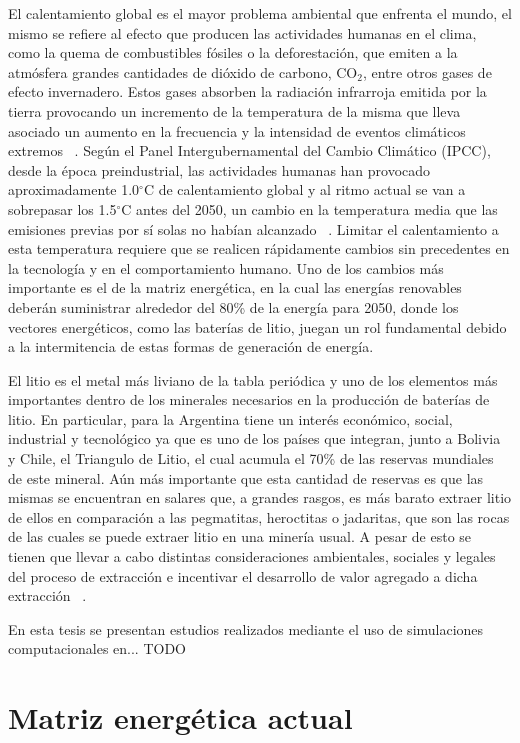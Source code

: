 El calentamiento global es el mayor problema ambiental que enfrenta el mundo, el 
mismo se refiere al efecto que producen las actividades humanas en el clima, como 
la quema de combustibles fósiles o la deforestación, que emiten a la atmósfera
grandes cantidades de dióxido de carbono, CO$_2$, entre otros gases de efecto 
invernadero. Estos gases absorben la radiación infrarroja emitida por la tierra 
provocando un incremento de la temperatura de la misma que lleva asociado un 
aumento en la frecuencia y la intensidad de eventos climáticos extremos 
~\cite{houghton2005}. Según el Panel Intergubernamental del Cambio Climático 
(IPCC), desde la época preindustrial, las actividades humanas han provocado 
aproximadamente 1.0$^{\circ}$C de calentamiento global y al ritmo actual se van 
a sobrepasar los 1.5$^{\circ}$C antes del 2050, un cambio en la temperatura
media que las emisiones previas por sí solas no habían alcanzado
~\cite{harvey2018}. Limitar el calentamiento a esta temperatura requiere que se 
realicen rápidamente cambios sin precedentes en la tecnología y en el 
comportamiento humano. Uno de los cambios más importante es el de la matriz 
energética, en la cual las energías renovables deberán suministrar alrededor del 
80\% de la energía para 2050, donde los vectores energéticos, como las baterías 
de litio, juegan un rol fundamental debido a la intermitencia de estas formas de 
generación de energía.

El litio es el metal más liviano de la tabla periódica y uno de los elementos más
importantes dentro de los minerales necesarios en la producción de baterías de
litio. En particular, para la Argentina tiene un interés económico, social, 
industrial y tecnológico ya que es uno de los países que integran, junto a 
Bolivia y Chile, el Triangulo de Litio, el cual acumula el 70\% de las reservas 
mundiales de este mineral. Aún más importante que esta cantidad de reservas es 
que las mismas se encuentran en salares que, a grandes rasgos, es más barato
extraer litio de ellos en comparación a las pegmatitas, heroctitas o jadaritas, 
que son las rocas de las cuales se puede extraer litio en una minería usual.
A pesar de esto se tienen que llevar a cabo distintas consideraciones ambientales, 
sociales y legales del proceso de extracción e incentivar el desarrollo de valor
agregado a dicha extracción ~\cite{heredia2020}.

En esta tesis se presentan estudios realizados mediante el uso de simulaciones 
computacionales en... TODO

\section{Matriz energética actual}

